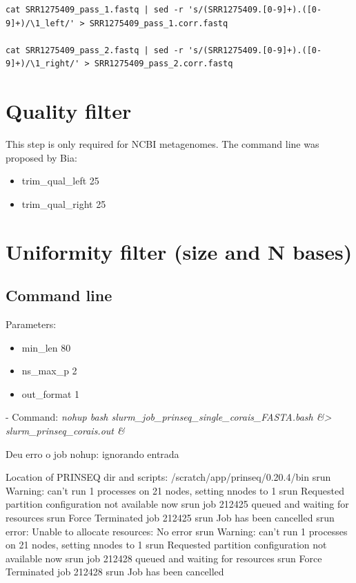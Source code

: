 \documentclass[12pt, a4paper]{report}
\begin{document}


\begin{lstlisting}[breaklines]
cat SRR1275409_pass_1.fastq | sed -r 's/(SRR1275409.[0-9]+).([0-9]+)/\1_left/' > SRR1275409_pass_1.corr.fastq

cat SRR1275409_pass_2.fastq | sed -r 's/(SRR1275409.[0-9]+).([0-9]+)/\1_right/' > SRR1275409_pass_2.corr.fastq
\end{lstlisting}

\chapter{Quality filter}
This step is only required for NCBI metagenomes. The command line was proposed by Bia:
\begin{itemize}
\item trim\_qual\_left 25
\item trim\_qual\_right 25
\end{itemize}


\chapter{Uniformity filter (size and N bases)}
\section{Command line}
Parameters:
\begin{itemize}
\item min\_len 80 
\item ns\_max\_p 2 
\item out\_format 1
\end{itemize}

\begin{tcolorbox}[width=6.3in]
 - Command: \textit{nohup bash slurm\_job\_prinseq\_single\_corais\_FASTA.bash \&> slurm\_prinseq\_corais.out \&}
 \end{tcolorbox}

Deu erro o job\:
nohup: ignorando entrada

\begin{tcolorbox}[width=6.3in]
 \scriptsize 
Location of PRINSEQ dir and scripts: /scratch/app/prinseq/0.20.4/bin
srun\: Warning: can't run 1 processes on 21 nodes, setting nnodes to 1
srun\: Requested partition configuration not available now
srun\: job 212425 queued and waiting for resources
srun\: Force Terminated job 212425
srun\: Job has been cancelled
srun\: error: Unable to allocate resources: No error
srun\: Warning: can't run 1 processes on 21 nodes, setting nnodes to 1
srun\: Requested partition configuration not available now
srun\: job 212428 queued and waiting for resources
srun\: Force Terminated job 212428
srun\: Job has been cancelled
\end{tcolorbox}
\end{document}
